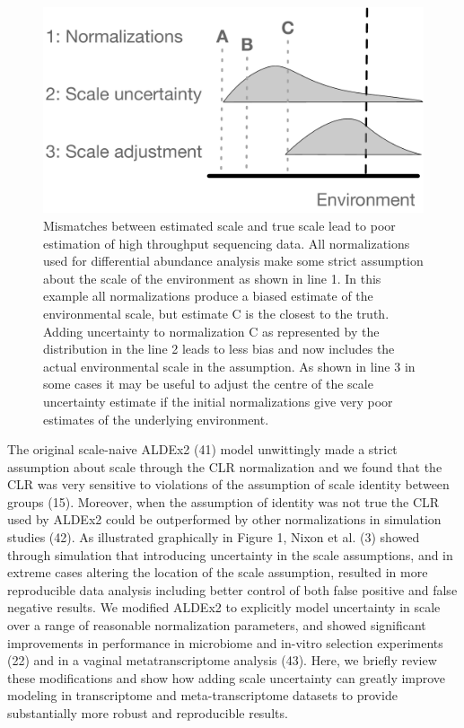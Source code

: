 \documentclass[
]{article}
\begin{document}
\begin{figure}

{\centering \includegraphics[width=0.6\linewidth]{./go3_files/figure-latex/scale-explained} 

}

\caption{Mismatches between estimated scale and true scale lead to poor estimation of high throughput sequencing data. All normalizations used for differential abundance analysis make some strict assumption about the scale of the environment as shown in line 1. In this example all normalizations produce a biased estimate of the environmental scale, but estimate C is the closest to the truth.  Adding uncertainty to normalization C as represented by the distribution in the line 2 leads to less bias and now includes the actual environmental scale in the assumption. As shown in line 3 in some cases it may be useful to adjust the centre of the scale uncertainty estimate if the initial normalizations give very poor estimates of the underlying environment.}\label{fig:unnamed-chunk-1}
\end{figure}

The original scale-naive ALDEx2 (41) model unwittingly made a strict
assumption about scale through the CLR normalization and we found that
the CLR was very sensitive to violations of the assumption of scale
identity between groups (15). Moreover, when the assumption of identity
was not true the CLR used by ALDEx2 could be outperformed by other
normalizations in simulation studies (42). As illustrated graphically in
Figure 1, Nixon et al. (3) showed through simulation that introducing
uncertainty in the scale assumptions, and in extreme cases altering the
location of the scale assumption, resulted in more reproducible data
analysis including better control of both false positive and false
negative results. We modified ALDEx2 to explicitly model uncertainty in
scale over a range of reasonable normalization parameters, and showed
significant improvements in performance in microbiome and in-vitro
selection experiments (22) and in a vaginal metatranscriptome analysis
(43). Here, we briefly review these modifications and show how adding
scale uncertainty can greatly improve modeling in transcriptome and
meta-transcriptome datasets to provide substantially more robust and
reproducible results.
\end{document}
